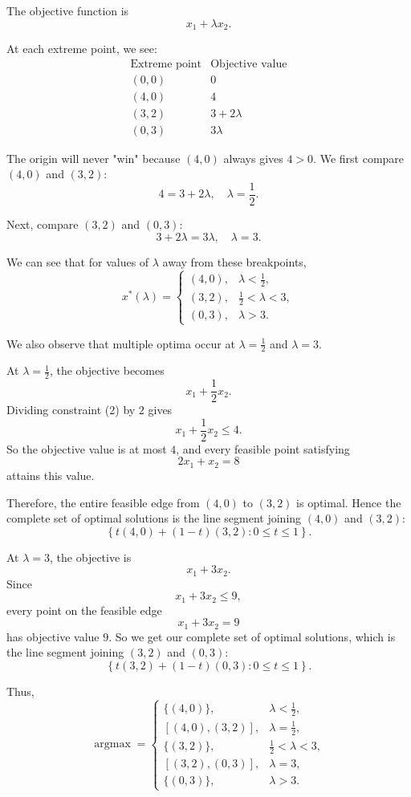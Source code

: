 \documentclass{article}
\begin{document}
The objective function is
\[
x_1+\lambda x_2.
\]

At each extreme point, we see: 
\[
\begin{array}{c|c}
\text{Extreme point} & \text{Objective value}\\
\hline
(0,0) & 0\\
(4,0) & 4\\
(3,2) & 3+2\lambda\\
(0,3) & 3\lambda
\end{array}
\]

The origin will never "win" because $(4,0)$ always gives $4 > 0$. We first compare $(4,0)$ and
$(3,2)$:
\[
4=3+2\lambda, \quad 
\lambda=\frac12.
\]

Next, compare $(3,2)$ and $(0,3)$:
\[
3+2\lambda=3\lambda, \quad
\lambda=3.
\]

We can see that for values of $\lambda$ away from these breakpoints,
\[
\boxed{x^*(\lambda)=
\begin{cases}
(4,0), & \lambda<\frac12,\\[2mm]
(3,2), & \frac12<\lambda<3,\\[2mm]
(0,3), & \lambda>3.
\end{cases}}
\]

We also observe that multiple optima occur at $\lambda = \frac{1}{2}$ and $\lambda = 3$. 


At $\lambda=\frac12$, the objective becomes
\[
x_1+\frac12x_2.
\]
Dividing constraint (2) by $2$ gives
\[
x_1+\frac12x_2\leq 4.
\]
So the objective value is at most $4$, and every feasible point
satisfying
\[
2x_1+x_2=8
\]
attains this value.


Therefore, the entire feasible edge from $(4,0)$
to $(3,2)$ is optimal. Hence the complete set of optimal solutions is
the line segment joining $(4,0)$ and $(3,2)$:
\[
\boxed{
\left\{
t(4,0)+(1-t)(3,2):0\le t\le1
\right\}.}
\]

At $\lambda=3$, the objective is
\[
x_1+3x_2.
\]
Since
\[
x_1+3x_2\le9,
\]
every point on the feasible edge
\[
x_1+3x_2=9
\]
has objective value $9$. So we get our complete set of optimal solutions, which is the line segment joining $(3,2)$ and $(0,3)$:
\[
\boxed{
\left\{
t(3,2)+(1-t)(0,3):0\le t\le1
\right\}.}
\]

Thus,
\[
\boxed{
\operatorname{argmax}=
\begin{cases}
\{(4,0)\}, & \lambda<\frac12,\\[1mm]
[(4,0),(3,2)], & \lambda=\frac12,\\[1mm]
\{(3,2)\}, & \frac12<\lambda<3,\\[1mm]
[(3,2),(0,3)], & \lambda=3,\\[1mm]
\{(0,3)\}, & \lambda>3.
\end{cases}}
\]
\end{document}
